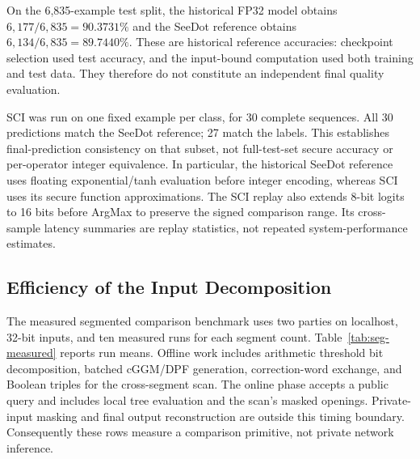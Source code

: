 \documentclass[journal]{IEEEtran}
\theoremstyle{definition}
\theoremstyle{plain}
\begin{document}
On the 6,835-example test split, the historical FP32 model obtains
$6{,}177/6{,}835=90.3731\%$ and the SeeDot reference obtains
$6{,}134/6{,}835=89.7440\%$. These are historical reference accuracies:
checkpoint selection used test accuracy, and the input-bound computation used
both training and test data. They therefore do not constitute an independent
final quality evaluation.

SCI was run on one fixed example per class, for 30 complete sequences.
All 30 predictions match the SeeDot reference; 27 match the labels.
This establishes final-prediction consistency on that subset, not full-test-set
secure accuracy or per-operator integer equivalence. In particular, the
historical SeeDot reference uses floating exponential/tanh evaluation before
integer encoding, whereas SCI uses its secure function approximations.
The SCI replay also extends 8-bit logits to 16 bits before ArgMax to preserve
the signed comparison range. Its cross-sample latency summaries are replay
statistics, not repeated system-performance estimates.

\subsection{Efficiency of the Input Decomposition}\label{sec:eval-split}

The measured segmented comparison benchmark uses two parties on localhost,
32-bit inputs, and ten measured runs for each segment count.
Table~\ref{tab:seg-measured} reports run means. Offline work includes arithmetic
threshold bit decomposition, batched cGGM/DPF generation, correction-word
exchange, and Boolean triples for the cross-segment scan. The online phase
accepts a public query and includes local tree evaluation and the scan's masked
openings. Private-input masking and final output reconstruction are outside
this timing boundary. Consequently these rows measure a comparison primitive,
not private network inference.
\end{document}

